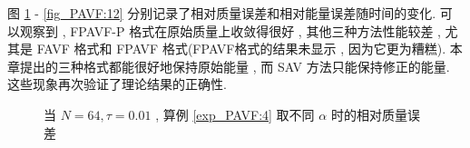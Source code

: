 	图 \ref{fig_PAVF:11} - \ref{fig_PAVF:12} 分别记录了相对质量误差和相对能量误差随时间的变化.
	可以观察到 , FPAVF-P 格式在原始质量上收敛得很好 , 其他三种方法性能较差 , 尤其是 FAVF 格式和 FPAVF 格式(FPAVF格式的结果未显示 , 因为它更为糟糕).
	本章提出的三种格式都能很好地保持原始能量 , 而 SAV 方法只能保持修正的能量.
	这些现象再次验证了理论结果的正确性.
\begin{figure}[H]
\begin{center}
\caption{当  $N = 64 , \tau=0.01$ , 算例 \ref{exp_PAVF:4} 取不同 $\alpha$ 时的相对质量误差}
\label{fig_PAVF:11}
\end{center}
\end{figure}


